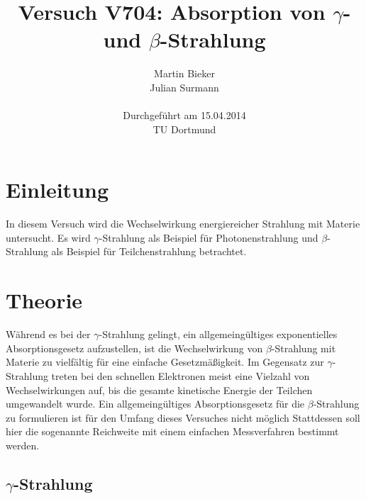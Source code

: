 \documentclass[11pt,ngerman,a4paper]{article}
\title{\textbf{Versuch V704: Absorption von $\gamma$- und $\beta$-Strahlung}}
\author{Martin Bieker\\
		Julian Surmann\\
		\\
		Durchgef\"{u}hrt am 15.04.2014\\
		TU Dortmund}
\date{}
\begin{document}
\renewcommand\tablename{Tabelle}
\renewcommand\figurename{Abbildung}
\maketitle
\thispagestyle{empty}
\newpage
\clearpage
\setcounter{page}{1}


\section{Einleitung}
In diesem Versuch wird die Wechselwirkung energiereicher Strahlung mit Materie untersucht. Es wird $\gamma$-Strahlung als Beispiel für Photonenstrahlung und $\beta$-Strahlung als Beispiel für Teilchenstrahlung betrachtet.
\section{Theorie}
Während es bei der $\gamma$-Strahlung gelingt, ein allgemeingültiges exponentielles Absorptionsgesetz aufzustellen, ist die Wechselwirkung von $\beta$-Strahlung mit Materie zu vielfältig für eine einfache Gesetzmäßigkeit. Im Gegensatz zur $\gamma$-Strahlung treten bei den schnellen Elektronen meist eine Vielzahl von Wechselwirkungen auf, bis die gesamte kinetische Energie der Teilchen umgewandelt wurde. Ein allgemeingültiges Absorptionsgesetz für die $\beta$-Strahlung zu formulieren ist für den Umfang dieses Versuches nicht möglich Stattdessen soll hier die sogenannte Reichweite mit einem einfachen Messverfahren bestimmt werden.
\subsection{$\gamma$-Strahlung}
\end{document}
